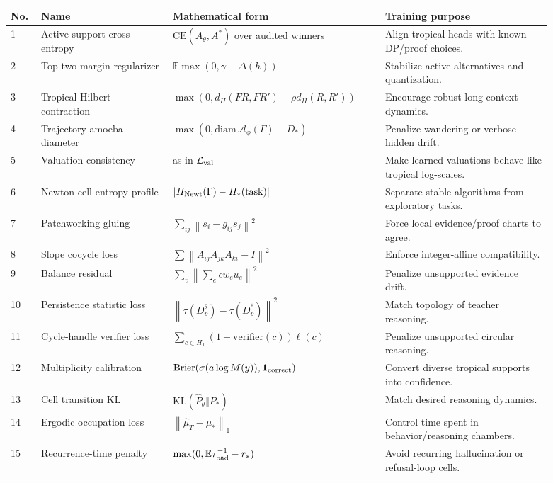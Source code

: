 \documentclass[11pt]{article}
\newcommand{\E}{\mathbb{E}}
\newcommand{\calA}{\mathcal{A}}
\newcommand{\calL}{\mathcal{L}}
\newcommand{\norm}[1]{\left\lVert #1\right\rVert}
\newcommand{\abs}[1]{\left\lvert #1\right\rvert}
\begin{document}
\begin{longtable}{p{0.05\linewidth}p{0.22\linewidth}p{0.34\linewidth}p{0.28\linewidth}}
\toprule
No. & Name & Mathematical form & Training purpose \\
\midrule
\endhead
1 & Active support cross-entropy & \(\mathrm{CE}(A_\theta,A^*)\) over audited winners & Align tropical heads with known DP/proof choices. \\
2 & Top-two margin regularizer & \(\E\max(0,\gamma-\Delta(h))\) & Stabilize active alternatives and quantization. \\
3 & Tropical Hilbert contraction & \(\max(0,d_H(FR,FR')-\rho d_H(R,R'))\) & Encourage robust long-context dynamics. \\
4 & Trajectory amoeba diameter & \(\max(0,\mathrm{diam}\,\calA_\phi(\Gamma)-D_*)\) & Penalize wandering or verbose hidden drift. \\
5 & Valuation consistency & as in \(\calL_{\rm val}\) & Make learned valuations behave like tropical log-scales. \\
6 & Newton cell entropy profile & \(\abs{H_{\rm Newt}(\Gamma)-H_*(\mathrm{task})}\) & Separate stable algorithms from exploratory tasks. \\
7 & Patchworking gluing & \(\sum_{ij}\norm{s_i-g_{ij}s_j}^2\) & Force local evidence/proof charts to agree. \\
8 & Slope cocycle loss & \(\sum\norm{A_{ij}A_{jk}A_{ki}-I}^2\) & Enforce integer-affine compatibility. \\
9 & Balance residual & \(\sum_v\norm{\sum_e\epsilon w_eu_e}^2\) & Penalize unsupported evidence drift. \\
10 & Persistence statistic loss & \(\norm{\tau(D_p^\theta)-\tau(D_p^*)}^2\) & Match topology of teacher reasoning. \\
11 & Cycle-handle verifier loss & \(\sum_{c\in H_1} (1-\mathrm{verifier}(c))\ell(c)\) & Penalize unsupported circular reasoning. \\
12 & Multiplicity calibration & \(\mathrm{Brier}(\sigma(a\log M(y)),\mathbf 1_{\rm correct})\) & Convert diverse tropical supports into confidence. \\
13 & Cell transition KL & \(\mathrm{KL}(\hat P_\theta\Vert P_*)\) & Match desired reasoning dynamics. \\
14 & Ergodic occupation loss & \(\norm{\hat\mu_T-\mu_*}_1\) & Control time spent in behavior/reasoning chambers. \\
15 & Recurrence-time penalty & \(\max(0,\E\tau_{\rm bad}^{-1}-r_*)\) & Avoid recurring hallucination or refusal-loop cells. \\

\end{longtable}
\end{document}
